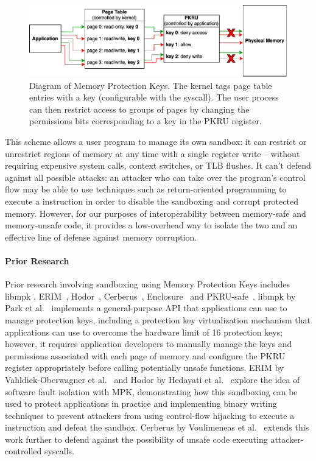 \begin{figure}[!ht]
    \includegraphics[width=\textwidth]{fig/mpk}
    \caption[Diagram of Memory Protection Keys]{Diagram of Memory Protection Keys. The kernel tags
    page table entries with a key (configurable with the  syscall). The user
    process can then restrict access to groups of pages by changing the permissions bits
    corresponding to a key in the PKRU register.}
    \label{f:mpk}
\end{figure}

This scheme allows a user program to manage its own sandbox: it can restrict or unrestrict regions
of memory at any time with a single register write -- without requiring expensive system calls,
context switches, or TLB flushes. It can't defend against all possible attacks: an attacker who can
take over the program's control flow may be able to use techniques such as return-oriented
programming to execute a  instruction in order to disable the sandboxing and corrupt
protected memory. However, for our purposes of interoperability between memory-safe and
memory-unsafe code, it provides a low-overhead way to isolate the two and an effective line of
defense against memory corruption.

\paragraph{Prior Research} Prior research involving sandboxing using Memory Protection Keys includes
libmpk \cite{park:libmpk}, ERIM~\cite{vahldiek-oberwagner:erim}, Hodor~\cite{hedayati:hodor},
Cerberus~\cite{voulimeneas:cerberus}, Enclosure~\cite{ghoshn:enclosure} and
PKRU-safe~\cite{kirth:pkru}. libmpk by Park et al.~\cite{park:libmpk} implements a general-purpose
API that applications can use to manage protection keys, including a protection key virtualization
mechanism that applications can use to overcome the hardware limit of 16 protection keys; however,
it requires application developers to manually manage the keys and permissions associated with each
page of memory and configure the PKRU register appropriately before calling potentially unsafe
functions. ERIM by Vahldiek-Oberwagner et al.~\cite{vahldiek-oberwagner:erim} and Hodor by Hedayati
et al.~\cite{hedayati:hodor} explore the idea of software fault isolation with MPK, demonstrating
how this sandboxing can be used to protect applications in practice and implementing binary writing
techniques to prevent attackers from using control-flow hijacking to execute a 
instruction and defeat the sandbox. Cerberus by Voulimeneas et al.~\cite{voulimeneas:cerberus}
extends this work further to defend against the possibility of unsafe code executing
attacker-controlled syscalls.


